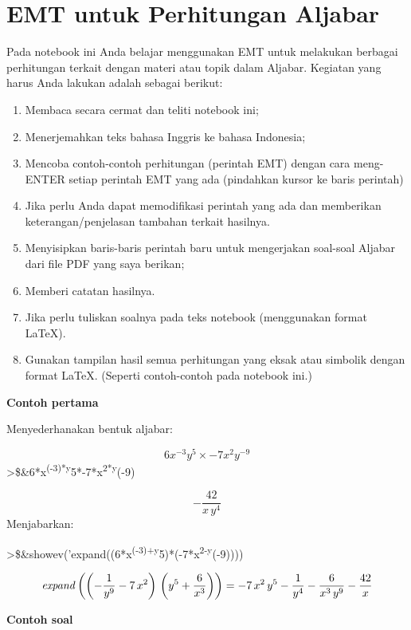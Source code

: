 \documentclass[
]{book}
\author{}
\date{}
\providecommand{\tightlist}{%
  \setlength{\itemsep}{0pt}\setlength{\parskip}{0pt}}
\begin{document}
\frontmatter

\mainmatter
\chapter{EMT untuk Perhitungan Aljabar}\label{emt-untuk-perhitungan-aljabar}

Pada notebook ini Anda belajar menggunakan EMT untuk melakukan berbagai perhitungan terkait dengan materi atau topik dalam Aljabar. Kegiatan yang harus Anda lakukan adalah sebagai berikut:

\begin{enumerate}
\def\labelenumi{\arabic{enumi}.}
\tightlist
\item
  Membaca secara cermat dan teliti notebook ini;
\item
  Menerjemahkan teks bahasa Inggris ke bahasa Indonesia;
\item
  Mencoba contoh-contoh perhitungan (perintah EMT) dengan cara meng-ENTER setiap perintah EMT yang ada (pindahkan kursor ke baris perintah)
\item
  Jika perlu Anda dapat memodifikasi perintah yang ada dan memberikan keterangan/penjelasan tambahan terkait hasilnya.
\item
  Menyisipkan baris-baris perintah baru untuk mengerjakan soal-soal Aljabar dari file PDF yang saya berikan;
\item
  Memberi catatan hasilnya.
\item
  Jika perlu tuliskan soalnya pada teks notebook (menggunakan format LaTeX).
\item
  Gunakan tampilan hasil semua perhitungan yang eksak atau simbolik dengan format LaTeX. (Seperti contoh-contoh pada notebook ini.)
\end{enumerate}

\textbf{Contoh pertama}

Menyederhanakan bentuk aljabar:

\[6x^{-3}y^5\times -7x^2y^{-9}\]\textgreater\$\&6*x\textsuperscript{(-3)*y}5*-7*x\textsuperscript{2*y}(-9)

\[-\frac{42}{x\,y^4}\]Menjabarkan:

\textgreater\$\&showev('expand((6*x\textsuperscript{(-3)+y}5)*(-7*x\textsuperscript{2-y}(-9))))

\[{\it expand}\left(\left(-\frac{1}{y^9}-7\,x^2\right)\,\left(y^5+\frac{6}{x^3}\right)\right)=-7\,x^2\,y^5-\frac{1}{y^4}-\frac{6}{x^3\,y^9}-\frac{42}{x}\]

\textbf{Contoh soal}
\end{document}
